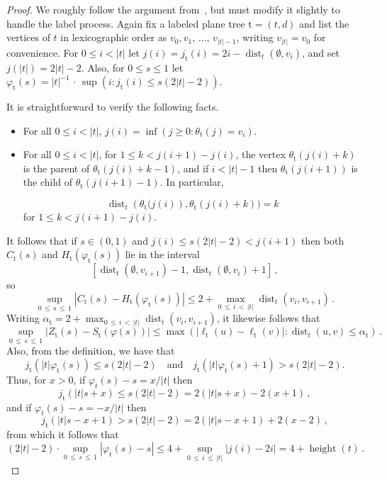 \documentclass[10pt]{amsart}
\theoremstyle{definition}\newtheorem{defi}[theo]{Definition}\newtheorem{rema}[theo]{Remark}\newtheorem{exam}[theo]{Example}\newtheorem{exem}[theo]{Example}\newtheorem{nota}[theo]{Notation}
\newcommand{\rt}{\mathrm{t}}
\DeclareMathOperator{\dist}{dist}
\DeclareMathOperator{\height}{height}
\begin{document}
\begin{proof}
We roughly follow the argument from~\cite[Section~1.6]{LeGallSurvey}, but must modify it slightly to handle the label process. Again fix a labeled plane tree $\rt=(t,d)$ and list the vertices of $t$ in lexicographic order as $v_0,v_1,\,\ldots,\,v_{|t|-1}$, writing $v_{|t|}=v_0$ for convenience. For $0 \le i < |t|$ let $j(i)=j_\rt(i) = 2i- \dist_t(\emptyset,v_i)$, and set $j(|t|)=2|t|-2$. Also, for $0 \le s \le 1$ let $\varphi_\rt(s) = |t|^{-1}\,\cdot\,\sup(i: j_\rt(i) \le s(2|t|-2))$.

It is straightforward to verify the following facts.
\begin{itemize}
\item For all $0 \le i < |t|$, $j(i)= \inf(j \ge 0:\theta_\rt(j) = v_i)$.
\item For all $0 \le i < |t|$, for $1 \le k < j(i+1)-j(i)$, the vertex $\theta_\rt(j(i)+k)$ is the parent of $\theta_\rt(j(i)+k-1)$, and if $i < |t|-1$ then $\theta_\rt(j(i+1))$ is the child of $\theta_\rt(j(i+1)-1)$. In particular,

\[
\dist_t\left(\theta_\rt(j(i)\right),\theta_\rt(j(i)+k))=k\,
\]
for $1 \le k < j(i+1)-j(i)$.
\end{itemize}

It follows that if $s \in (0,1)$ and $j(i) \le s(2|t|-2) < j(i+1)$ then both $C_\rt(s)$ and $H_\rt(\varphi_\rt(s))$ lie in the interval
\[
\left[\dist_t(\emptyset,v_{i+1})-1,\dist_t(\emptyset,v_i)+1\right]\,,
\]
so
\begin{equation}\label{eq:chbound}
\sup_{0\, \le\,s\,\le\,1} \left|C_\rt(s)-H_\rt(\varphi_\rt(s))\right| \le 2+\max_{0\,\le\,i\,<\,|t|} \dist_t(v_i,v_{i+1})\,.
\end{equation}
Writing $\alpha_\rt = 2+\max_{0\,\le\,i\,<\,|t|} \dist_t(v_i,v_{i+1})$, it likewise follows that
\begin{equation}\label{eq:szbound}
\sup_{0\,\le\,s\,\le\,1} \left|Z_\rt(s)-S_\rt(\varphi(s))\right|
\le \max\left(\left|\ell_\rt(u)-\ell_\rt(v)\right|: \dist_t(u,v) \le \alpha_\rt\right)\,.
\end{equation}
Also, from the definition, we have that
\[
j_\rt(|t|\varphi_\rt(s))\leq s(2|t|-2)\quad \text{and}\quad j_\rt(|t|\varphi_\rt(s)+1)> s(2|t|-2).
\]
Thus, for $x > 0$, if $\varphi_t(s)-s=x/|t|$ then
\[
j_{\rt}(|t|s+x) \le s(2|t|-2) = 2(|t|s+x)-2(x+1)\,,
\]
and if $\varphi_t(s)-s=-x/|t|$ then
\[
j_{\rt}(|t|s-x+1) > s(2|t|-2) = 2(|t|s-x+1)+2(x-2)\,,
\]
from which it follows that
\begin{equation}\label{eq:phisbound}
(2|t|-2)\cdot \sup_{0\,\le\,s\,\le\,1} \left| \varphi_\rt(s)-s\right| \le 4+\sup_{0\,\le\,i\,\le\,|t|} \left|j(i)-2i\right| = 4+\height(t)\,.
\end{equation}


\end{proof}
\end{document}
